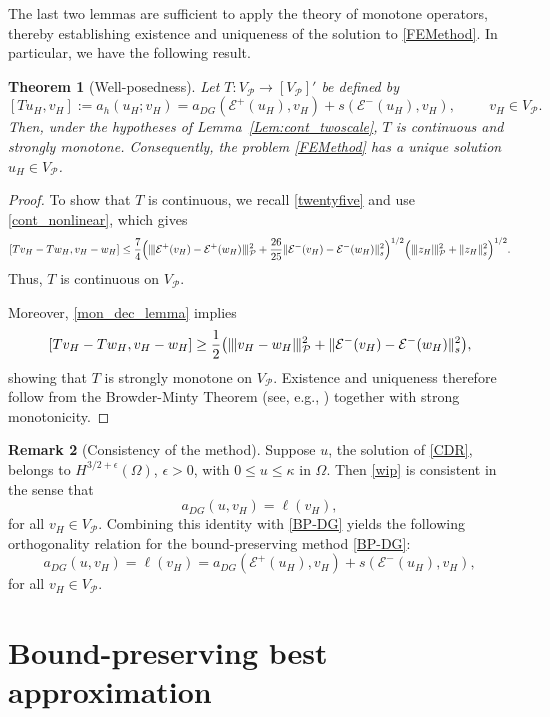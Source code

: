 \documentclass[11pt,final]{amsart}
\theoremstyle{plain}
\newtheorem{theorem}{Theorem}[section]
\theoremstyle{definition}
\newtheorem{Remark}[theorem]{Remark}
\newcommand\calP{{\mathcal{P}}}
\newcommand{\mesh}{\calP}
\newcommand{\ndgp}[1]{| \kern -.25mm \|{#1}| \kern -.25mm \|_{\rm \mesh}}
\newcommand{\norm}[2]{\|{#1}\|_{{#2}}}
\begin{document}
The last two lemmas are sufficient to apply the theory of monotone
operators, thereby establishing existence and uniqueness of the
solution to \eqref{FEMethod}. In particular, we have the following
result.

\begin{theorem}[Well-posedness]
\label{Theorem11}
Let $T:V_\calP^{}\rightarrow [V_\calP^{}]'$ be defined by  
\[
[Tu_{H},v_{H}]:=a_h(u_H;v_H)=a_{DG}(\mathcal{E}^{+}(u_{H}),v_{H})+s(\mathcal{E}^{-}(u_{H}),v_{H}), \hspace{1cm} v_{H}\in V_\calP.
\]
Then, under the hypotheses of Lemma~\ref{Lem:cont_twoscale}, $T$ is
continuous and strongly monotone. Consequently, the problem
\eqref{FEMethod} has a unique solution $u_H\in V_\mesh$.
\end{theorem}

\begin{proof}  
To show that $T$ is continuous, we recall \eqref{twentyfive} and use
\eqref{cont_nonlinear}, which gives
\[
[Tv_H-Tw_H,v_H-w_H]\le \frac{7}{4}\Big(\ndgp{\mathcal{E}^+(v_H)-\mathcal{E}^+(w_H)}^2+\frac{26}{25}\norm{\mathcal{E}^-(v_H)-\mathcal{E}^-(w_H)}{s}^2\Big)^{1/2} \Big(\ndgp{z_H}^2+\norm{z_H}{s}^2\Big)^{1/2}.
\]
Thus, $T$ is continuous on $V_\mesh$.  

Moreover, \eqref{mon_dec_lemma} implies
\[
[Tv_H-Tw_H,v_H-w_H] \ge \frac{1}{2}\big(\ndgp{v_H-w_H}^2+\norm{\mathcal{E}^-(v_H)-\mathcal{E}^-(w_H)}{s}^2\big),
\]
showing that $T$ is strongly monotone on $V_\mesh$. Existence and
uniqueness therefore follow from the Browder-Minty Theorem (see,
e.g., \cite[Theorem~10.41]{renardy2006introduction}) together with
strong monotonicity.
\end{proof}

\begin{Remark}[Consistency of the method]  
Suppose $u$, the solution of \eqref{CDR}, belongs to
$H^{3/2+\epsilon}(\Omega)$, $\epsilon>0$, with $0\le u\le \kappa$ in
$\Omega$. Then \eqref{wip} is consistent in the sense that
\[
a_{DG}(u,v_H) =\ell (v_H),  
\]
for all $v_H\in V_\mesh$. Combining this identity with \eqref{BP-DG}
yields the following orthogonality relation for the bound-preserving
method \eqref{BP-DG}:
\begin{equation}\label{BP-consistency}
a_{DG}(u,v_H) =\ell (v_H)=a_{DG}(\mathcal{E}^+(u_H),v_H)+s(\mathcal{E}^-(u_H),v_H),
\end{equation}
for all $v_H\in V_\mesh$. 
\end{Remark}

	
\section{Bound-preserving best approximation}\label{Sec:Interpol}
\end{document}
